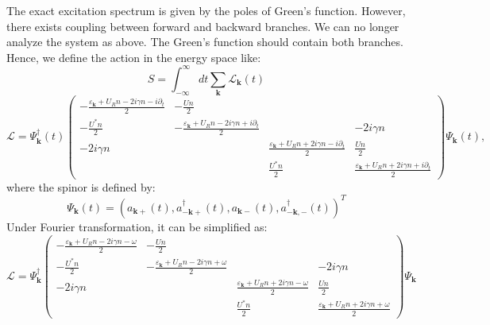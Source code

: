 \documentclass{article}
\newcommand{\tmmathbf}[1]{\ensuremath{\boldsymbol{#1}}}
\begin{document}
The exact excitation spectrum is given by the poles of Green's function.
However, there exists coupling between forward and backward branches. We can
no longer analyze the system as above. The Green's function should contain
both branches. Hence, we define the action in the energy space like:
\begin{equation}
  S = \int_{- \infty}^{\infty} d t \sum_{\tmmathbf{k}}
  \mathcal{L}_{\tmmathbf{k}} (t)
\end{equation}
\begin{equation}
  \mathcal{L}= \Psi_{\tmmathbf{k}}^{\dagger} (t) \left(\begin{array}{cccc}
    - \frac{\varepsilon_{\tmmathbf{k}} + U_R n - 2 i \gamma n - i
    \partial_t}{2} & - \frac{U n}{2} &  & \\
    - \frac{U^{\ast} n}{2} & - \frac{\varepsilon_{\tmmathbf{k}} + U_R n - 2 i
    \gamma n + i \partial_t}{2} &  & - 2 i \gamma n\\
    - 2 i \gamma n &  & \frac{\varepsilon_{\tmmathbf{k}} + U_R n + 2 i \gamma
    n - i \partial_t}{2} & \frac{U n}{2}\\
    &  & \frac{U^{\ast} n}{2} & \frac{\varepsilon_{\tmmathbf{k}} + U_R n + 2
    i \gamma n + i \partial_t}{2}
  \end{array}\right) \Psi_{\tmmathbf{k}} (t),
\end{equation}
where the spinor is defined by:
\begin{equation}
  \Psi_{\tmmathbf{k}} (t) = (a_{\tmmathbf{k}+} (t),
  a^{\dagger}_{-\tmmathbf{k}+} (t), a_{\tmmathbf{k}-} (t),
  a^{\dagger}_{-\tmmathbf{k}, -} (t))^T
\end{equation}
Under Fourier transformation, it can be simplified as:
\begin{equation}
  \mathcal{L}= \Psi_{\tmmathbf{k}}^{\dagger} \left(\begin{array}{cccc}
    - \frac{\varepsilon_{\tmmathbf{k}} + U_R n - 2 i \gamma n - \omega}{2} & -
    \frac{U n}{2} &  & \\
    - \frac{U^{\ast} n}{2} & - \frac{\varepsilon_{\tmmathbf{k}} + U_R n - 2 i
    \gamma n + \omega}{2} &  & - 2 i \gamma n\\
    - 2 i \gamma n &  & \frac{\varepsilon_{\tmmathbf{k}} + U_R n + 2 i \gamma
    n - \omega}{2} & \frac{U n}{2}\\
    &  & \frac{U^{\ast} n}{2} & \frac{\varepsilon_{\tmmathbf{k}} + U_R n + 2
    i \gamma n + \omega}{2}
  \end{array}\right) \Psi_{\tmmathbf{k}}
\end{equation}
\end{document}
